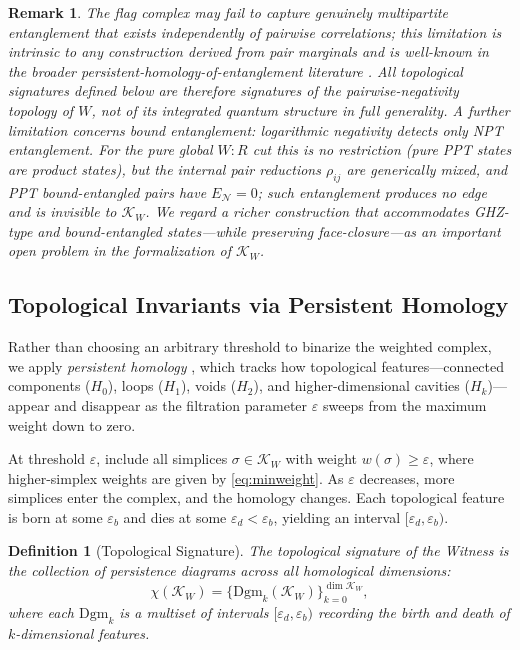 \documentclass[11pt, a4paper]{article}
\newtheorem{definition}{Definition}
\newtheorem{remark}{Remark}
\begin{document}
\begin{remark}
\label{rem:flag}
The flag complex may fail to capture genuinely multipartite entanglement that exists independently of pairwise correlations; this limitation is intrinsic to any construction derived from pair marginals and is well-known in the broader persistent-homology-of-entanglement literature \cite{DiPierro2018, Hamilton2024}. All topological signatures defined below are therefore signatures of the \emph{pairwise-negativity topology} of $W$, not of its integrated quantum structure in full generality. A further limitation concerns bound entanglement: logarithmic negativity detects only NPT entanglement. For the pure global $W{:}R$ cut this is no restriction (pure PPT states are product states), but the internal pair reductions $\rho_{ij}$ are generically mixed, and PPT bound-entangled pairs have $E_{\mathcal{N}} = 0$; such entanglement produces no edge and is invisible to $\mathcal{K}_W$. We regard a richer construction that accommodates GHZ-type and bound-entangled states---while preserving face-closure---as an important open problem in the formalization of $\mathcal{K}_W$.
\end{remark}

\subsection{Topological Invariants via Persistent Homology}
\label{sec:persistence}

Rather than choosing an arbitrary threshold to binarize the weighted complex, we apply \emph{persistent homology} \cite{Edelsbrunner2002, Zomorodian2005}, which tracks how topological features---connected components ($H_0$), loops ($H_1$), voids ($H_2$), and higher-dimensional cavities ($H_k$)---appear and disappear as the filtration parameter $\varepsilon$ sweeps from the maximum weight down to zero.

At threshold $\varepsilon$, include all simplices $\sigma \in \mathcal{K}_W$ with weight $w(\sigma) \geq \varepsilon$, where higher-simplex weights are given by \eqref{eq:minweight}. As $\varepsilon$ decreases, more simplices enter the complex, and the homology changes. Each topological feature is born at some $\varepsilon_b$ and dies at some $\varepsilon_d < \varepsilon_b$, yielding an interval $[\varepsilon_d, \varepsilon_b)$.

\begin{definition}[Topological Signature]
The \emph{topological signature} of the Witness is the collection of persistence diagrams across all homological dimensions:
\begin{equation}
\chi(\mathcal{K}_W) = \bigl\{ \mathrm{Dgm}_k(\mathcal{K}_W) \bigr\}_{k=0}^{\dim \mathcal{K}_W},
\label{eq:persistence}
\end{equation}
where each $\mathrm{Dgm}_k$ is a multiset of intervals $[\varepsilon_d, \varepsilon_b)$ recording the birth and death of $k$-dimensional features.
\end{definition}
\end{document}
